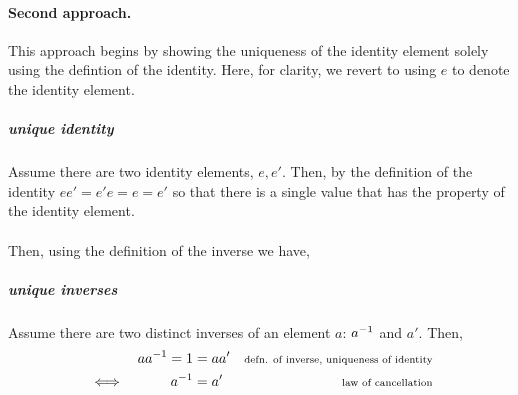 \documentclass[MathsNotesBase.tex]{subfiles}
\begin{document}
{		\paragraph*{Second approach.} This approach begins by showing the uniqueness of the identity element solely using the defintion of the identity. Here, for clarity, we revert to using $e$ to denote the identity element.
		\subparagraph*{unique identity} Assume there are two identity elements, $e, e'$. Then, by the definition of the identity $ee' = e'e = e = e'$ so that there is a single value that has the property of the identity element.\\\\
		Then, using the definition of the inverse we have,
		\subparagraph{unique inverses} Assume there are two distinct inverses of an element $a$: ${a}^{-1}$ and $a'$. Then, 
		\begin{align*}
		&& a{a}^{-1} = 1 &= aa' &\text{\scriptsize{defn. of inverse, uniqueness of identity}}\\
		& \iff & {a}^{-1} &= a' &\text{\scriptsize{law of cancellation}}
		\end{align*}
		\bigskip\bigskip

}
\end{document}
